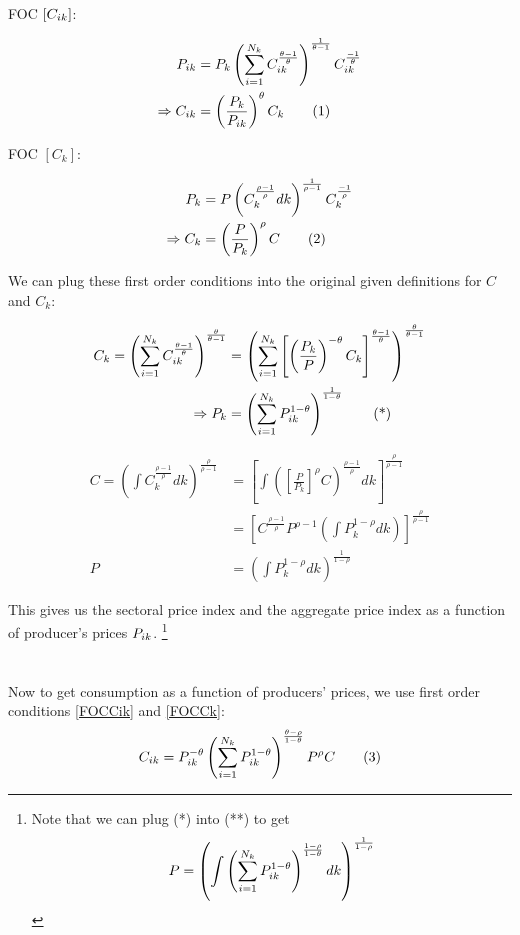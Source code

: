 \documentclass[12pt,oneside,reqno]{amsart}
\newcommand\numberthis{\addtocounter{equation}{1}\tag{\theequation}} %
\begin{document}
\pagebreak
FOC $[C_{ik}]$:

\begin{align*}
P\ik & = P_k \left(\sumi C\ik^{\frac{\theta-1}{\theta}} \right)^{\frac{1}{\theta-1}} C\ik^{\frac{-1}{\theta}}
\\
\Rightarrow
C\ik & = \left( \frac{P_k}{P\ik}\right)^\theta C_k
      \numberthis \label{FOCCik}
\end{align*}


FOC $[C_k]$:

\begin{align*}
P_k & = P \left(C_k^{\frac{\rho-1}{\rho}}dk \right)^{\frac{1}{\rho-1}} C_k^{\frac{-1}{\rho}} 
\\
\Rightarrow
C_k & = \left( \frac{P}{P_k}\right)^\rho C 
    \numberthis \label{FOCCk} 
\end{align*}


We can plug these first order conditions into the original given definitions for $C$ and $C_k$:

\begin{align*}
C_k = \left( \sum_{i=1}^{N_k} C_{ik}^{\frac{\theta-1}{\theta}}\right)^{\frac{\theta}{\theta-1}}
& = \left( \sum_{i=1}^{N_k} \left[ \left(\frac{P_k}{P}\right)^{-\theta} C_k\right]^{\frac{\theta-1}{\theta}}\right)^{\frac{\theta}{\theta-1}}
\\
\Rightarrow P_k & = \left(\sum_{i=1}^{N_k} P_{ik} ^{1-\theta}\right)
        ^{\frac{1}{1-\theta}}
        \tag{*} 
\end{align*}


\begin{align*}
C = \left( \int C_k^{\frac{\rho-1}{\rho}}dk\right)^{\frac{\rho}{\rho-1}}
& = \left[ \int \left( \left[ 
    \frac{P}{P_k}\right]^\rho C \right)^{\frac{\rho-1}
    {\rho}} dk \right]^{\frac{\rho}{\rho-1}}
\\
& = \left[C^{\frac{\rho-1}{\rho}} P^{\rho-1} 
    \left( \int P_k^{1-\rho} dk \right)
    \right]^{\frac{\rho}{\rho-1}} 
\\
P & = \left(\int P_k^{1-\rho}dk\right)^{\frac{1}{1-\rho}} 
        \tag{**} 
\end{align*}

This gives us the sectoral price index and the aggregate price index as a function of producer's prices $P_{ik}$.
    \footnote{Note that we can plug (*) into (**) to 
    get 
    \[ P = \left(\int\left(\sum_{i=1}^{N_k} P_{ik} ^{1-\theta}
    \right)^{\frac{1-\rho}{1-\theta}} 
    dk\right)^{\frac{1}{1-\rho}}
    \] }
    \\
\\
\\    
Now to get consumption as a function of producers' prices, we use first order conditions \eqref{FOCCik} and \eqref{FOCCk}:
\[ C\ik = P\ik^{-\theta} \left( \sumi P\ik^{1-\theta}\right) ^{\frac{\theta-\rho}{1-\theta}} P^\rho C \numberthis\]
\end{document}
